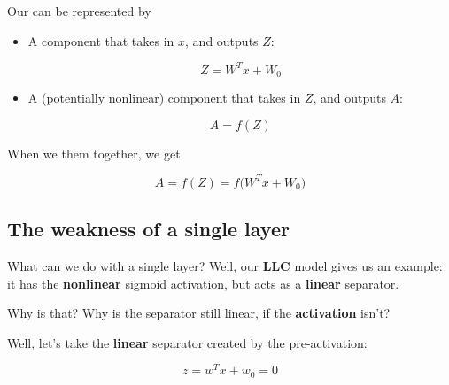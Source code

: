         \begin{definition}
            Our  can be represented by
            
            \begin{itemize}
                \item A  component that takes in $x$, and outputs  $Z$:
                
                \begin{equation*}
                    Z = W^T x + W_0
                \end{equation*}
                
                \item A (potentially nonlinear)  component that takes in $Z$, and outputs  $A$:
                
                \begin{equation*}
                    A = f(Z)
                \end{equation*}
                
            \end{itemize}
        
            When we  them together, we get
                
                \begin{equation*}
                    A = f(Z) = f \Big( W^Tx+W_0 \Big)
                \end{equation*}
        \end{definition}
        
    \subsection{The weakness of a single layer}
    
        What can we do with a single layer? Well, our \textbf{LLC} model gives us an example: it has the \textbf{nonlinear} sigmoid activation, but acts as a \textbf{linear} separator.
        
        Why is that? Why is the separator still linear, if the \textbf{activation} isn't?
        
        Well, let's take the \textbf{linear} separator created by the pre-activation:
        
        \begin{equation}
            z = w^T x + w_0 = 0 
        \end{equation}
        
